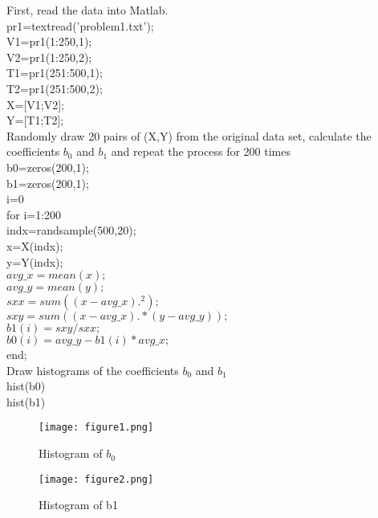 \documentclass[12pt]{article}
\begin{document}
 { \vfill
  \answer
} {First, read the data into Matlab.\\
pr1=textread('problem1.txt');\\
V1=pr1(1:250,1);\\
V2=pr1(1:250,2);\\
T1=pr1(251:500,1);\\
T2=pr1(251:500,2);\\
X=[V1;V2];\\
Y=[T1;T2];\\
Randomly draw  20 pairs of (X,Y) from the original data set, calculate the coefficients $b_0 $ and $b_1 $ and repeat the process  for 200 times\\
b0=zeros(200,1);\\
b1=zeros(200,1);\\
i=0\\
for i=1:200\\
indx=randsample(500,20);\\
x=X(indx);\\
y=Y(indx);\\
$avg\_x = mean(x);$\\
$avg\_y = mean(y);$\\
$sxx= sum((x-avg\_x).^2);$\\
$sxy= sum((x-avg\_x).*(y-avg\_y));$\\
$b1(i) = sxy/sxx;$\\
$b0(i) = avg\_y-b1(i)*avg\_x;$\\
end;\\
Draw histograms of the coefficients $b_0$ and $ b_1$\\
hist(b0)\\
hist(b1)\\
\begin{figure}[h!]
\centering
\graphicspath{{c:/users/qun/desktop/}}
\texttt{[image: figure1.png]}
\caption{Histogram of $b_0$}
\end{figure}

\begin{figure}[h!]
\centering
\graphicspath{{c:/users/qun/desktop/}}
\texttt{[image: figure2.png]}
\caption{Histogram of b1}
\end{figure}

}
\end{document}
